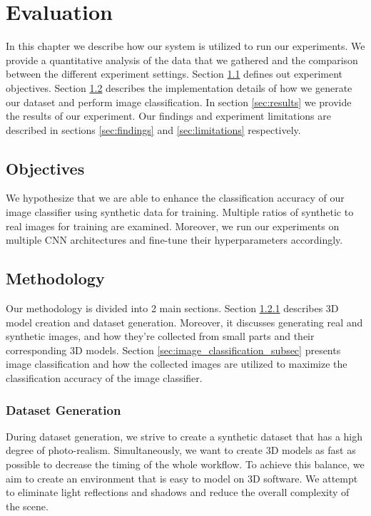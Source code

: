 \chapter{Evaluation}\label{ch:evaluation}

In this chapter we describe how our system is utilized to run our experiments. We provide a quantitative analysis of the data that we gathered and the comparison between the different experiment settings. Section \ref{sec:objectives} defines out experiment objectives. Section \ref{sec:methodology} describes the implementation details of how we generate our dataset and perform image classification. In section \ref{sec:results} we provide the results of our experiment. Our findings and experiment limitations are described in sections \ref{sec:findings} and \ref{sec:limitations} respectively.


\section{Objectives}\label{sec:objectives}

We hypothesize that we are able to enhance the classification accuracy of our image classifier using synthetic data for training. Multiple ratios of synthetic to real images for training are examined. Moreover, we run our experiments on multiple CNN architectures and fine-tune their hyperparameters accordingly.


\section{Methodology}\label{sec:methodology}

Our methodology is divided into 2 main sections. Section \ref{sec:dataset_generation_subsec} describes 3D model creation and dataset generation. Moreover, it discusses generating real and synthetic images, and how they're collected from small parts and their corresponding 3D models. Section \ref{sec:image_classification_subsec} presents image classification and how the collected images are utilized to maximize the classification accuracy of the image classifier.


\subsection{Dataset Generation}\label{sec:dataset_generation_subsec}

During dataset generation, we strive to create a synthetic dataset that has a high degree of photo-realism. Simultaneously, we want to create 3D models as fast as possible to decrease the timing of the whole workflow. To achieve this balance, we aim to create an environment that is easy to model on 3D software. We attempt to eliminate light reflections and shadows and reduce the overall complexity of the scene.

